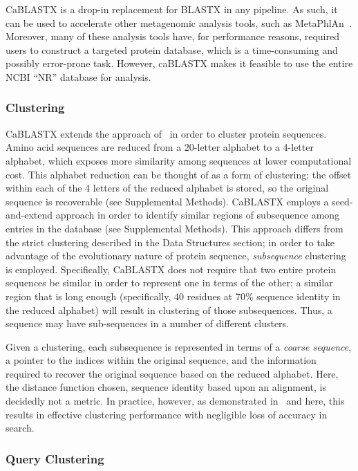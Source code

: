 \documentclass[review,preprint,12pt]{elsarticle}
\renewcommand{\cite}{\citep} %
\theoremstyle{definition}
\theoremstyle{remark}
\numberwithin{equation}{section}
\begin{document}
CaBLASTX is a drop-in replacement for BLASTX in any pipeline.
As such, it can be used to accelerate other metagenomic analysis tools, such
as MetaPhlAn~\cite{segata2012metagenomic}.
Moreover, many of these analysis tools have, for performance reasons, required
users to construct a targeted protein database, which is a time-consuming and
possibly error-prone task.
However, caBLASTX makes it feasible to use the entire NCBI ``NR'' database for
analysis.

\subsubsection{Clustering}

CaBLASTX extends the approach of~\cite{daniels2013compressive} in order to 
cluster protein sequences.
Amino acid sequences are reduced from a 20-letter alphabet to a 4-letter
alphabet, which exposes more similarity among sequences at lower computational
cost.
This alphabet reduction can be thought of as a form of clustering; the offset 
within each of the 4 letters of the reduced alphabet is stored, so the original
sequence is recoverable (see Supplemental Methods).
CaBLASTX employs a seed-and-extend approach in order to identify similar regions
of subsequence among entries in the database (see Supplemental Methods).
This approach differs from the strict clustering described in the Data 
Structures section; in order to take advantage of the evolutionary nature of
protein sequence, \emph{subsequence} clustering is employed.
Specifically, CaBLASTX does not require that two entire protein sequences be 
similar in order to represent one in terms of the other; a similar region that 
is long enough (specifically, 40 residues at 70\% sequence identity in the 
reduced alphabet) will result in clustering of those subsequences. 
Thus, a sequence may have sub-sequences in a number of different clusters.

Given a clustering, each subsequence is represented in terms of a 
\emph{coarse sequence}, a pointer to the indices within the original sequence,
and the information required to recover the original sequence based on the
reduced alphabet.
Here, the distance function chosen, sequence identity based upon an alignment,
is decidedly not a metric.
In practice, however, as demonstrated in~\cite{daniels2013compressive} and 
here, this results in effective clustering performance with negligible loss of 
accuracy in search.

\subsubsection{Query Clustering}
\end{document}
